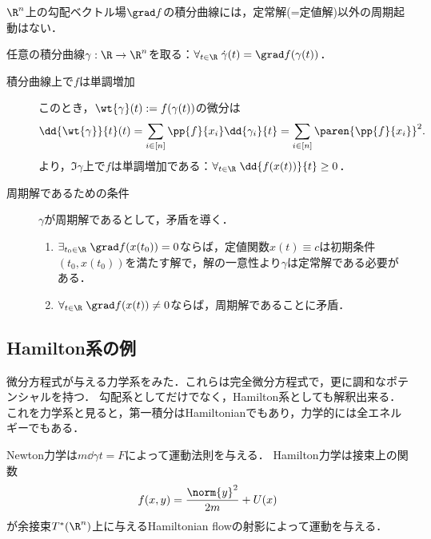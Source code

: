\documentclass[uplatex,dvipdfmx]{jsreport}
\begin{document}
\begin{theorem}[勾配ベクトル場の力学系としての自明性]
    $\R^n$上の勾配ベクトル場$\grad f$の積分曲線には，定常解(=定値解)以外の周期起動はない．
\end{theorem}
\begin{Proof}
    任意の積分曲線$\gamma:\R\to\R^n$を取る：$\forall_{t\in\R}\;\dot{\gamma}(t)=\grad f(\gamma(t))$．
    \begin{description}
        \item[積分曲線上で$f$は単調増加] このとき，$\wt{\gamma}(t):=f(\gamma(t))$の微分は
        \[\dd{\wt{\gamma}}{t}(t)=\sum_{i\in[n]}\pp{f}{x_i}\dd{\gamma_i}{t}=\sum_{i\in[n]}\paren{\pp{f}{x_i}}^2.\]
        より，$\Im\gamma$上で$f$は単調増加である：$\forall_{t\in\R}\;\dd{f(x(t))}{t}\ge0$．
        \item[周期解であるための条件] $\gamma$が周期解であるとして，矛盾を導く．
        \begin{enumerate}
            \item $\exists_{t_0\in\R}\;\grad f(x(t_0))=0$ならば，定値関数$x(t)\equiv c$は初期条件$(t_0,x(t_0))$を満たす解で，解の一意性より$\gamma$は定常解である必要がある．
            \item $\forall_{t\in\R}\;\grad f(x(t))\ne0$ならば，周期解であることに矛盾．
        \end{enumerate}
    \end{description}
\end{Proof}

\subsection{Hamilton系の例}

\begin{tcolorbox}[colframe=ForestGreen, colback=ForestGreen!10!white,breakable,colbacktitle=ForestGreen!40!white,coltitle=black,fonttitle=\bfseries\sffamily,
title=]
    微分方程式が与える力学系をみた．これらは完全微分方程式で，更に調和なポテンシャルを持つ．
    勾配系としてだけでなく，Hamilton系としても解釈出来る．
    これを力学系と見ると，第一積分はHamiltonianでもあり，力学的には全エネルギーでもある．
\end{tcolorbox}

\begin{remarks}
    Newton力学は$m\dd{\gamma}{t}=F$によって運動法則を与える．
    Hamilton力学は接束上の関数
    \[f(x,y)=\frac{\norm{y}^2}{2m}+U(x)\]
    が余接束$T^*(\R^n)$上に与えるHamiltonian flowの射影によって運動を与える．
\end{remarks}
\end{document}

